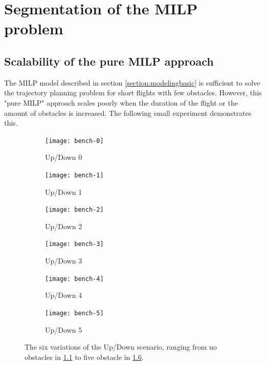 \chapter{Segmentation of the MILP problem}
\label{section:segment}

\section{Scalability of the pure MILP approach}
The MILP model described in section \ref{section:modelingbasic} is sufficient to solve the trajectory planning problem for short flights with few obstacles. However, this "pure MILP" approach scales poorly when the duration of the flight or the amount of obstacles is increased. The following small experiment demonstrates this.
\par
\begin{figure}[b]
	\centering
	\begin{subfigure}[t]{0.3\columnwidth}
        		\texttt{[image: bench-0]}
        		\caption{Up/Down 0}
        		 \label{fig:bench-0}
	\end{subfigure}	
	\hfill
	\begin{subfigure}[t]{0.3\columnwidth}
        		\texttt{[image: bench-1]}
        		\caption{Up/Down 1}
        		 \label{fig:bench-1}
	\end{subfigure}	
	\hfill
	\begin{subfigure}[t]{0.3\columnwidth}
        		\texttt{[image: bench-2]}
        		\caption{Up/Down 2}
        		 \label{fig:bench-2}
	\end{subfigure}
	\begin{subfigure}[t]{0.3\columnwidth}
        		\texttt{[image: bench-3]}
        		\caption{Up/Down 3}
        		 \label{fig:bench-3}
	\end{subfigure}	
	\hfill
	\begin{subfigure}[t]{0.3\columnwidth}
        		\texttt{[image: bench-4]}
        		\caption{Up/Down 4}
        		 \label{fig:bench-4}
	\end{subfigure}	
	\hfill
	\begin{subfigure}[t]{0.32\columnwidth}
        		\texttt{[image: bench-5]}
        		\caption{Up/Down 5}
        		 \label{fig:bench-5}
	\end{subfigure}		
	
			
	\caption[The six variations of the Up/Down scenario]{The six variations of the Up/Down scenario, ranging from no obstacles in \ref{fig:bench-0} to five obstacle in \ref{fig:bench-5}.}
    \label{fig:bench-pure}     
\end{figure}
